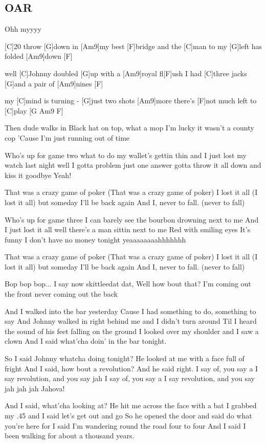 \documentclass[a4paper,12pt]{article}
\begin{document}
\begin{multicols}{2}
\subsection*{OAR}
\begin{guitar}
Ohh myyyy

     
[C]20 throw [G]down in [Am9]my best [F]bridge
and the [C]man to my [G]left has folded [Am9]down [F]

well [C]Johnny doubled [G]up with a [Am9]royal fl[F]ush
I had [C]three jacks [G]and a pair of [Am9]nines [F]

my [C]mind is turning - [G]just two shots [Am9]more
there's [F]not much left to [C]play [G Am9 F]


Then dude walks in Black hat on top, 
what a mop
I'm lucky it wasn't a county cop
'Cause I'm just running out of time


Who's up for game two
what to do
my wallet's gettin thin
and I just lost my watch last night
well I gotta problem
just one answer
gotta throw it all down
and kiss it goodbye
Yeah!


That was a crazy game of poker
(That was a crazy game of poker)
I lost it all
(I lost it all)
but someday I'll be back again
And I, never to fall.
(never to fall)


Who's up for game three
I can barely see the bourbon 
drowning next to me
And I just lost it all
well there's a man sittin next to me
Red with smiling eyes
It's funny
I don't have no money tonight
yeaaaaaaaahhhhhhh


That was a crazy game of poker
(That was a crazy game of poker)
I lost it all
(I lost it all)
but someday I'll be back again
And I, never to fall.
(never to fall)


Bop bop bop...
I say now skittleedat dat,
Well how bout that?
I'm coming out the front 
never coming out the back


And I walked into the bar yesterday
Cause I had something to do, 
something to say
And Johnny walked in right behind me 
and I didn't turn around
Til I heard the sound of his feet 
falling on the ground
I looked over my shoulder and I saw a clown
And I said what'cha doin' in the bar tonight.


So I said Johnny whatcha doing tonight?
He looked at me with a face full of fright
And I said, how bout a revolution?
And he said right.
I say of, you say a
I say revolution, and you say jah
I say of, you say a
I say revolution, and you say jah jah jah
Jahova!


And I said, what'cha looking at?
He hit me across the face with a bat
I grabbed my .45 and I said let's get out and go
So he opened the door and said 
do what you're here for
I said I'm wandering round the road four to four
And I said 
I been walking for about a thousand years.



\end{guitar}
\end{multicols}
\end{document}

